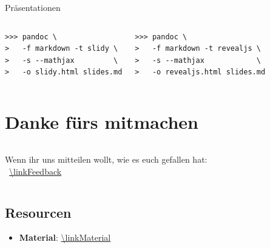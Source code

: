 \documentclass[14pt,aspectratio=169]{beamer}
\begin{document}
\begin{frame}[fragile]{\insertsection \quad\small Präsentationen}
    
    \begin{Beispiel}[\faMarkdown\faArrowRight\faTv\faFilePdf]
    \end{Beispiel}

    \begin{columns}
        
        \begin{Beispiel}
            \begin{verbatim}
>>> pandoc \
>   -f markdown -t slidy \
>   -s --mathjax         \
>   -o slidy.html slides.md
            \end{verbatim}
        \end{Beispiel}
        
        
        
        
        \begin{Beispiel}[\faMarkdown\faArrowRight\faTv HTML]
            \begin{verbatim}
>>> pandoc \
>   -f markdown -t revealjs \
>   -s --mathjax            \
>   -o revealjs.html slides.md
            \end{verbatim}
        \end{Beispiel}
        
    \end{columns}
\end{frame}



\section*{Danke fürs mitmachen}
\begin{frame}
    \sectionpage
    \vspace{1em}
    \begin{columns}[c]
        Wenn ihr uns mitteilen wollt, wie es euch gefallen hat:\\
        \faComment*[regular]\ \url{\linkFeedback}
        \centering
        \qrcode[height=.6\textwidth]{\linkFeedback}
    \end{columns}
\end{frame}


\subsection*{Resourcen}
\begin{frame}{\insertsubsection}
    \begin{itemize}
        \item \textbf{Material}: \url{\linkMaterial}
    \end{itemize}
\end{frame}


\end{document}

